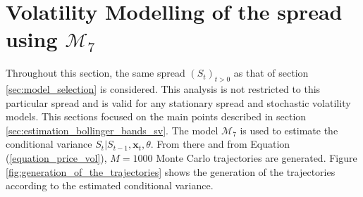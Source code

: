 \documentclass[11pt,a4,twosided,singlespacing,titlepagenumber=on]{scrreprt}
\numberwithin{equation}{chapter} %
\theoremstyle{remark}
\newcommand{\matr}[1]{\mathbf{#1}}
\begin{document}
\section{Volatility Modelling of the spread using $\mathcal{M}_7$}
Throughout this section, the same spread $(S_t)_{t>0}$ as that of section \ref{sec:model_selection} is considered. This analysis is not restricted to this particular spread and is valid for any stationary spread and stochastic volatility models. This sections focused on the main points described in section \ref{sec:estimation_bollinger_bands_sv}. The model $\mathcal{M}_7$ is used to estimate the conditional variance $S_t | S_{t-1}, \matr{x}_t, \theta$. From there and from Equation (\ref{equation_price_vol}), $M = 1000$ Monte Carlo trajectories are generated. Figure \ref{fig:generation_of_the_trajectories} shows the generation of the trajectories according to the estimated conditional variance.
\end{document}
